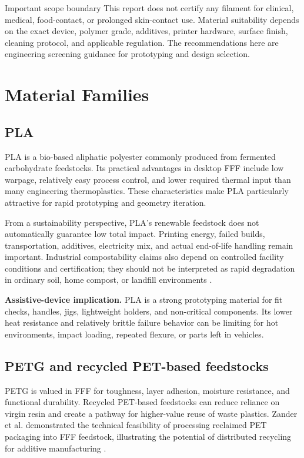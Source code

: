 \documentclass[11pt]{article}
\begin{document}
\begin{cautionbox}{Important scope boundary}
This report does not certify any filament for clinical, medical, food-contact, or prolonged skin-contact use. Material suitability depends on the exact device, polymer grade, additives, printer hardware, surface finish, cleaning protocol, and applicable regulation. The recommendations here are engineering screening guidance for prototyping and design selection.
\end{cautionbox}

\section{Material Families}

\subsection{PLA}

PLA is a bio-based aliphatic polyester commonly produced from fermented carbohydrate feedstocks. Its practical advantages in desktop FFF include low warpage, relatively easy process control, and lower required thermal input than many engineering thermoplastics. These characteristics make PLA particularly attractive for rapid prototyping and geometry iteration.

From a sustainability perspective, PLA's renewable feedstock does not automatically guarantee low total impact. Printing energy, failed builds, transportation, additives, electricity mix, and actual end-of-life handling remain important. Industrial compostability claims also depend on controlled facility conditions and certification; they should not be interpreted as rapid degradation in ordinary soil, home compost, or landfill environments \cite{astmd6400,sola2024}.

\textbf{Assistive-device implication.} PLA is a strong prototyping material for fit checks, handles, jigs, lightweight holders, and non-critical components. Its lower heat resistance and relatively brittle failure behavior can be limiting for hot environments, impact loading, repeated flexure, or parts left in vehicles.

\subsection{PETG and recycled PET-based feedstocks}

PETG is valued in FFF for toughness, layer adhesion, moisture resistance, and functional durability. Recycled PET-based feedstocks can reduce reliance on virgin resin and create a pathway for higher-value reuse of waste plastics. Zander et al. demonstrated the technical feasibility of processing reclaimed PET packaging into FFF feedstock, illustrating the potential of distributed recycling for additive manufacturing \cite{zander2018}.
\end{document}
